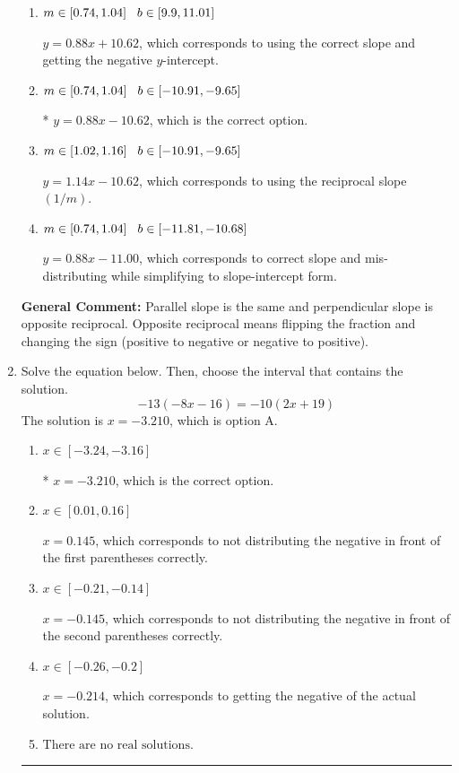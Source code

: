 \documentclass{extbook}[14pt]
\newcommand{\litem}[1]{\item #1

\rule{\textwidth}{0.4pt}}
\begin{document}
\begin{enumerate}
{\begin{enumerate}[label=\Alph*.]
 $y = -0.88x - 5.38$, which corresponds to using the negative slope.
\item \( m \in [0.74, 1.04] \hspace*{3mm} b \in [9.9, 11.01] \)

 $y = 0.88x + 10.62$, which corresponds to using the correct slope and getting the negative $y$-intercept.
\item \( m \in [0.74, 1.04] \hspace*{3mm} b \in [-10.91, -9.65] \)

* $y = 0.88x - 10.62$, which is the correct option.
\item \( m \in [1.02, 1.16] \hspace*{3mm} b \in [-10.91, -9.65] \)

 $y = 1.14x - 10.62$, which corresponds to using the reciprocal slope $(1/m)$.
\item \( m \in [0.74, 1.04] \hspace*{3mm} b \in [-11.81, -10.68] \)

 $y = 0.88x - 11.00$, which corresponds to correct slope and mis-distributing while simplifying to slope-intercept form.
\end{enumerate}

\textbf{General Comment:} Parallel slope is the same and perpendicular slope is opposite reciprocal. Opposite reciprocal means flipping the fraction and changing the sign (positive to negative or negative to positive).
}
\litem{
Solve the equation below. Then, choose the interval that contains the solution.
\[ -13(-8x -16) = -10(2x + 19) \]The solution is \( x = -3.210 \), which is option A.\begin{enumerate}[label=\Alph*.]
\item \( x \in [-3.24, -3.16] \)

* $x = -3.210$, which is the correct option.
\item \( x \in [0.01, 0.16] \)

$x = 0.145$, which corresponds to not distributing the negative in front of the first parentheses correctly.
\item \( x \in [-0.21, -0.14] \)

$x = -0.145$, which corresponds to not distributing the negative in front of the second parentheses correctly.
\item \( x \in [-0.26, -0.2] \)

$x = -0.214$, which corresponds to getting the negative of the actual solution.
\item \( \text{There are no real solutions.} \)


\end{enumerate}}
\end{enumerate}
\end{document}

